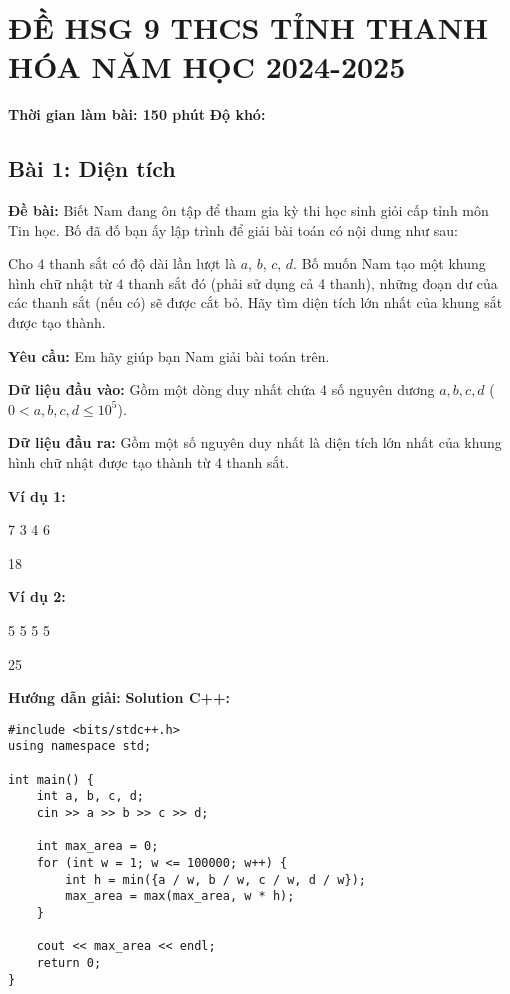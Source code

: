 \documentclass[12pt]{scrartcl}  %
\begin{document}
\section{ĐỀ HSG 9 THCS TỈNH THANH HÓA NĂM HỌC 2024-2025}
\textbf{Thời gian làm bài: 150 phút}
\textbf{Độ khó: }
\subsection{Bài 1: Diện tích}
\textbf{Đề bài:}
Biết Nam đang ôn tập để tham gia kỳ thi học sinh giỏi cấp tỉnh môn Tin học. Bố đã đố bạn ấy lập trình để giải bài toán có nội dung như sau:

Cho $4$ thanh sắt có độ dài lần lượt là $a$, $b$, $c$, $d$. Bố muốn Nam tạo một khung hình chữ nhật từ $4$ thanh sắt đó (phải sử dụng cả 4 thanh), những đoạn dư của các thanh sắt 
(nếu có) sẽ được cắt bỏ. Hãy tìm diện tích lớn nhất của khung sắt được tạo thành.

\textbf{Yêu cầu:}
Em hãy giúp bạn Nam giải bài toán trên.

\textbf{Dữ liệu đầu vào:}
Gồm một dòng duy nhất chứa 4 số nguyên dương $a, b, c, d$ ($0 < a, b, c, d \leq 10^5$).

\textbf{Dữ liệu đầu ra:}
Gồm một số nguyên duy nhất là diện tích lớn nhất của khung hình chữ nhật được tạo thành từ 4 thanh sắt.

\textbf{Ví dụ 1:}
\begin{tcolorbox}[colback=gray!5!white, colframe=blue!50!black, title=Input]
7 3 4 6
\end{tcolorbox}
\begin{tcolorbox}[colback=gray!5!white, colframe=green!50!black, title=Output]
18
\end{tcolorbox}

\textbf{Ví dụ 2:}
\begin{tcolorbox}[colback=gray!5!white, colframe=blue!50!black, title=Input]
5 5 5 5
\end{tcolorbox}
\begin{tcolorbox}[colback=gray!5!white, colframe=green!50!black, title=Output]
25
\end{tcolorbox}
\textbf{Hướng dẫn giải:}
\textbf{Solution C++:}
\begin{lstlisting}
#include <bits/stdc++.h>
using namespace std;

int main() {
    int a, b, c, d;
    cin >> a >> b >> c >> d;

    int max_area = 0;
    for (int w = 1; w <= 100000; w++) {
        int h = min({a / w, b / w, c / w, d / w});
        max_area = max(max_area, w * h);
    }

    cout << max_area << endl;
    return 0;
}
\end{lstlisting}
\end{document}
